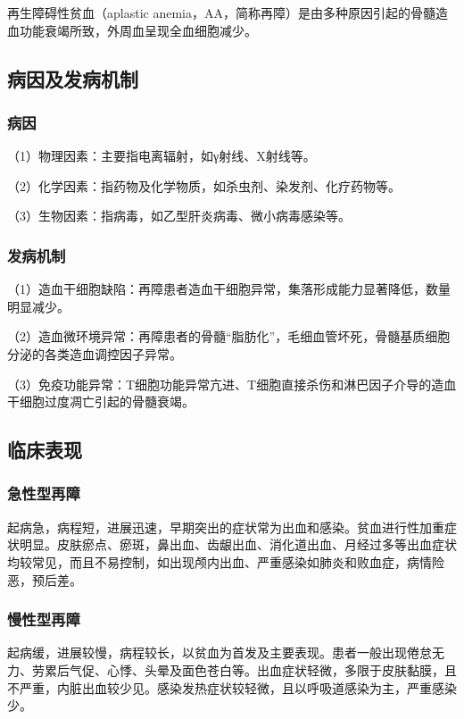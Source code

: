 再生障碍性贫血（aplastic
anemia，AA，简称再障）是由多种原因引起的骨髓造血功能衰竭所致，外周血呈现全血细胞减少。

\subsection{病因及发病机制}

\subsubsection{病因}

（1）物理因素：主要指电离辐射，如γ射线、X射线等。

（2）化学因素：指药物及化学物质，如杀虫剂、染发剂、化疗药物等。

（3）生物因素：指病毒，如乙型肝炎病毒、微小病毒感染等。

\subsubsection{发病机制}

（1）造血干细胞缺陷：再障患者造血干细胞异常，集落形成能力显著降低，数量明显减少。

（2）造血微环境异常：再障患者的骨髓“脂肪化”，毛细血管坏死，骨髓基质细胞分泌的各类造血调控因子异常。

（3）免疫功能异常：T细胞功能异常亢进、T细胞直接杀伤和淋巴因子介导的造血干细胞过度凋亡引起的骨髓衰竭。

\subsection{临床表现}

\subsubsection{急性型再障}

起病急，病程短，进展迅速，早期突出的症状常为出血和感染。贫血进行性加重症状明显。皮肤瘀点、瘀斑，鼻出血、齿龈出血、消化道出血、月经过多等出血症状均较常见，而且不易控制，如出现颅内出血、严重感染如肺炎和败血症，病情险恶，预后差。

\subsubsection{慢性型再障}

起病缓，进展较慢，病程较长，以贫血为首发及主要表现。患者一般出现倦怠无力、劳累后气促、心悸、头晕及面色苍白等。出血症状轻微，多限于皮肤黏膜，且不严重，内脏出血较少见。感染发热症状较轻微，且以呼吸道感染为主，严重感染少。

